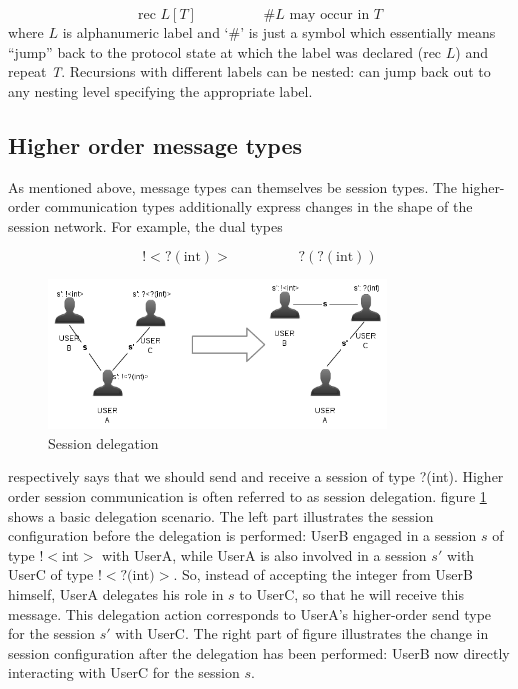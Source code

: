 \begin{equation*}
\text{rec }L[T] \hspace{2cm} \# L\text{ may occur in }T
\end{equation*}
where $L$ is alphanumeric label and `\#' is just a symbol which essentially means ``jump'' back to the protocol state at which the label was declared (rec $L$) and repeat \textit{T}. Recursions with different labels can be nested: can jump back out to any nesting level specifying the appropriate label.

\subsection{Higher order message types}

As mentioned above, message types can themselves be session types. The higher-order communication types additionally express changes in the shape of the session network. For example, the dual types

\begin{equation*}
!<?(\text{int})> \hspace{2cm} ?(?(\text{int}))
\end{equation*}

\begin{figure}
\centering
\includegraphics[width=0.8\textwidth]{resources/sj_delegation_session.png}
\caption{Session delegation}\label{fig:sj-delegation}
\end{figure}

respectively says that we should send and receive a session of type ?(int). Higher order session communication is often referred to as session delegation. figure \ref{fig:sj-delegation} shows a basic delegation scenario. The left part illustrates the session configuration before the delegation is performed: UserB engaged in a session $s$ of type $!<$int$>$ with UserA, while UserA is also involved in a session $s'$ with UserC of type $!<?($int$)>$. So, instead of accepting the integer from UserB himself, UserA delegates his role in $s$ to UserC, so that he will receive this message. This delegation action corresponds to UserA's higher-order send type for the session $s'$ with UserC. The right part of figure illustrates the change in session configuration after the delegation has been performed: UserB now directly interacting with UserC for the session $s$.

